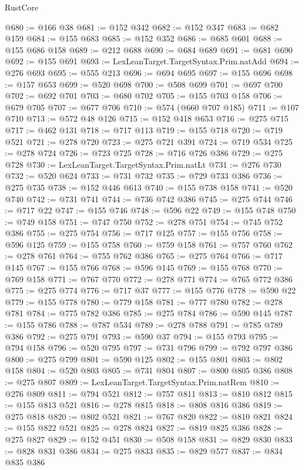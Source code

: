 \begin{lexlean}{RustCore}
\begin{coremodule}
@680 := @166 @38
@681 := @152 @342
@682 := @152 @347
@683 := @682 @159
@684 := @155 @683
@685 := @152 @352
@686 := @685 @601
@688 := @155 @686 @158
@689 := @212 @688
@690 := @684 @689
@691 := @681 @690
@692 := @155 @691
@693 := LexLeanTarget.TargetSyntax.Prim.natAdd
@694 := @276 @693
@695 := @555 @213
@696 := @694 @695
@697 := @155 @696
@698 := @157 @653
@699 := @520 @698
@700 := @508 @699
@701 := @697 @700
@702 := @692 @701
@703 := @680 @702
@705 := @155 @703 @158
@706 := @679 @705
@707 := @677 @706
@710 := @574 (@660 @707 @185)
@711 := @107 @710
@713 := @572 @48 @126
@715 := @152 @418 @653
@716 := @275 @715
@717 := @462 @131
@718 := @717 @113
@719 := @155 @718
@720 := @719 @521
@721 := @278 @720
@723 := @275 @721 @391
@724 := @719 @534
@725 := @278 @724
@726 := @723 @725
@728 := @716 @726 @386
@729 := @275 @728
@730 := LexLeanTarget.TargetSyntax.Prim.natLt
@731 := @276 @730
@732 := @520 @624
@733 := @731 @732
@735 := @729 @733 @386
@736 := @275 @735
@738 := @152 @446 @613
@740 := @155 @738 @158
@741 := @520 @740
@742 := @731 @741
@744 := @736 @742 @386
@745 := @275 @744
@746 := @717 @22
@747 := @155 @746
@748 := @596 @22
@749 := @155 @748
@750 := @749 @158
@751 := @747 @750
@752 := @278 @751
@754 := @745 @752 @386
@755 := @275 @754
@756 := @717 @125
@757 := @155 @756
@758 := @596 @125
@759 := @155 @758
@760 := @759 @158
@761 := @757 @760
@762 := @278 @761
@764 := @755 @762 @386
@765 := @275 @764
@766 := @717 @145
@767 := @155 @766
@768 := @596 @145
@769 := @155 @768
@770 := @769 @158
@771 := @767 @770
@772 := @278 @771
@774 := @765 @772 @386
@775 := @275 @774
@776 := @717 @37
@777 := @155 @776
@778 := @590 @22
@779 := @155 @778
@780 := @779 @158
@781 := @777 @780
@782 := @278 @781
@784 := @775 @782 @386
@785 := @275 @784
@786 := @590 @145
@787 := @155 @786
@788 := @787 @534
@789 := @278 @788
@791 := @785 @789 @386
@792 := @275 @791
@793 := @590 @37
@794 := @155 @793
@795 := @794 @158
@796 := @520 @795
@797 := @731 @796
@799 := @792 @797 @386
@800 := @275 @799
@801 := @590 @125
@802 := @155 @801
@803 := @802 @158
@804 := @520 @803
@805 := @731 @804
@807 := @800 @805 @386
@808 := @275 @807
@809 := LexLeanTarget.TargetSyntax.Prim.natRem
@810 := @276 @809
@811 := @794 @521
@812 := @757 @811
@813 := @810 @812
@815 := @155 @813 @521
@816 := @278 @815
@818 := @808 @816 @386
@819 := @275 @818
@820 := @802 @521
@821 := @767 @820
@822 := @810 @821
@824 := @155 @822 @521
@825 := @278 @824
@827 := @819 @825 @386
@828 := @275 @827
@829 := @152 @451
@830 := @508 @158
@831 := @829 @830
@833 := @828 @831 @386
@834 := @275 @833
@835 := @829 @577
@837 := @834 @835 @386

\end{coremodule}
\end{lexlean}
